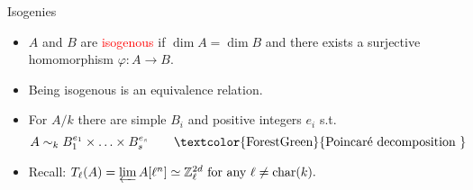 \documentclass[usenames,dvipsnames]{beamer}
\def\Z{\mathbb{Z}}
\def\C{\mathbb{C}}
\def\F{\mathbb{F}}
\DeclareMathOperator{\Char}{char}
\renewcommand{\char}{char}
\newcommand{\set}[1]{\left\lbrace#1\right\rbrace }
\newcommand{\red}[1]{\textcolor{red}{#1}}
\newcommand{\blue}[1]{\textcolor{blue}{#1}}
\newcommand{\green}[1]{\textcolor{ForestGreen}{#1}}
\begin{document}
%

\begin{frame}{ Isogenies }
	\begin{itemize}
		\item $A$ and $B$ are \red{isogenous} if $\dim A=\dim B$ and there exists a surjective homomorphism $\varphi:A\to B$.
		\pause \item Being isogenous is an equivalence relation.
		\pause \item For  $A/k$ there are simple $B_i$ and positive integers $e_i$ s.t.
  \[ A \sim_{k} B_1^{e_1}\times \ldots \times B_s^{e_s} \qquad\text{\green{Poincar\'e decomposition }}\]
        \pause \item Recall: $T_\ell(A) = \varprojlim A[\ell^n] \simeq \Z_\ell^{2d} \text{ for any }\ell\neq \Char(k).$ 
	\end{itemize}
\end{frame}
\end{document}
